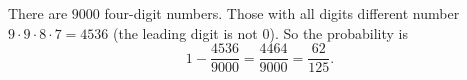 There are $9000$ four-digit numbers. Those with all digits different number $9\cdot9\cdot8\cdot7=4536$ (the leading digit is not $0$). So the probability is
\[1-\dfrac{4536}{9000}=\dfrac{4464}{9000}=\boxed{\dfrac{62}{125}}.\]

